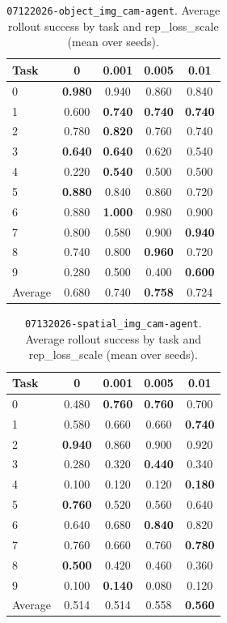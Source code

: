 \begin{table}
\caption{\texttt{07122026-object\_img\_cam-agent}. Average rollout success by task and rep\_loss\_scale (mean over seeds).}
\label{tab:07122026_object_img_cam_agent_rep_loss_success}
\begin{tabular}{lcccc}
\toprule
Task & 0 & 0.001 & 0.005 & 0.01 \\
\midrule
0 & \textbf{0.980} & 0.940 & 0.860 & 0.840 \\
1 & 0.600 & \textbf{0.740} & \textbf{0.740} & \textbf{0.740} \\
2 & 0.780 & \textbf{0.820} & 0.760 & 0.740 \\
3 & \textbf{0.640} & \textbf{0.640} & 0.620 & 0.540 \\
4 & 0.220 & \textbf{0.540} & 0.500 & 0.500 \\
5 & \textbf{0.880} & 0.840 & 0.860 & 0.720 \\
6 & 0.880 & \textbf{1.000} & 0.980 & 0.900 \\
7 & 0.800 & 0.580 & 0.900 & \textbf{0.940} \\
8 & 0.740 & 0.800 & \textbf{0.960} & 0.720 \\
9 & 0.280 & 0.500 & 0.400 & \textbf{0.600} \\
\midrule
Average & 0.680 & 0.740 & \textbf{0.758} & 0.724 \\
\bottomrule
\end{tabular}
\end{table}



\begin{table}
\caption{\texttt{07132026-spatial\_img\_cam-agent}. Average rollout success by task and rep\_loss\_scale (mean over seeds).}
\label{tab:07132026_spatial_img_cam_agent_rep_loss_success}
\begin{tabular}{lcccc}
\toprule
Task & 0 & 0.001 & 0.005 & 0.01 \\
\midrule
0 & 0.480 & \textbf{0.760} & \textbf{0.760} & 0.700 \\
1 & 0.580 & 0.660 & 0.660 & \textbf{0.740} \\
2 & \textbf{0.940} & 0.860 & 0.900 & 0.920 \\
3 & 0.280 & 0.320 & \textbf{0.440} & 0.340 \\
4 & 0.100 & 0.120 & 0.120 & \textbf{0.180} \\
5 & \textbf{0.760} & 0.520 & 0.560 & 0.640 \\
6 & 0.640 & 0.680 & \textbf{0.840} & 0.820 \\
7 & 0.760 & 0.660 & 0.760 & \textbf{0.780} \\
8 & \textbf{0.500} & 0.420 & 0.460 & 0.360 \\
9 & 0.100 & \textbf{0.140} & 0.080 & 0.120 \\
\midrule
Average & 0.514 & 0.514 & 0.558 & \textbf{0.560} \\
\bottomrule
\end{tabular}
\end{table}


